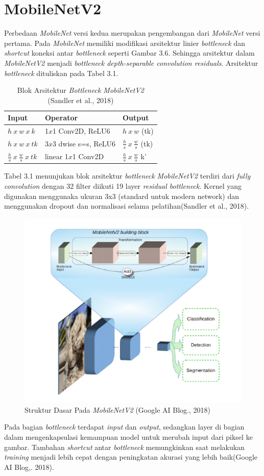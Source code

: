 \section{MobileNetV2}
Perbedaan \emph{MobileNet} versi kedua merupakan pengembangan dari \emph{MobileNet} versi pertama. Pada \emph{MobileNet} memiliki modifikasi arsitektur linier \emph{bottleneck} dan \emph{shortcut} koneksi antar \emph{bottleneck} seperti Gambar 3.6.
Sehingga arsitektur dalam \emph{MobileNetV2} menjadi \emph{bottleneck depth-separable convolution residuals}. Arsitektur \emph{bottleneck} dituliskan pada Tabel 3.1.
\begin{table}[H]
	\caption{Blok Arsitektur \emph{Bottleneck MobileNetV2} (Sandler et al., 2018)}
	\vspace{0cm}
	\centering
	\begin{tabular}{|p{3cm}|p{4cm}|p{3cm}|}
		\hline
		Input & Operator & Output \\
		\hline
		$h \ x \ w \ x \ k$ & 1$x$1 Conv2D, ReLU6 & $h \ x \ w$ (tk) \\ 
		\hline	
		$h \ x \ w \ x \ tk$ & 3$x$3 dwise s=s, ReLU6 & $\frac{h}{s} \ x \ \frac{w}{s}$ (tk) \\ 
		\hline	
		$\frac{h}{s} \ x \ \frac{w}{s} \ x \ tk$ & linear 1$x$1 Conv2D & $\frac{h}{s} \ x \ \frac{w}{s}$ k' \\ 
		\hline				
	\end{tabular}
\end{table}
Tabel 3.1 menunjukan blok arsitektur \emph{bottleneck} \emph{MobileNetV2} terdiri dari \emph{fully convolution} dengan 32 filter diikuti 19 layer \emph{residual bottleneck}.
Kernel yang digunakan menggunaka ukuran 3x3 (standard untuk modern network) dan menggunakan dropout dan normalisasi selama pelatihan(Sandler et al., 2018). 
\begin{figure}[H]
	\centering
	\includegraphics[width=0.6\linewidth]{"arsitektur"}
	\caption{Struktur Dasar Pada \emph{MobileNetV2} (Google AI Blog., 2018)}
	\label{fig:arsitektur}
\end{figure}
\noindent Pada bagian \emph{bottleneck} terdapat \emph{input} dan \emph{output}, sedangkan layer di bagian dalam mengenkapsulasi kemampuan model untuk merubah input dari piksel ke gambar. Tambahan \emph{shortcut} antar \emph{bottleneck} memungkinkan saat melakukan \emph{training} menjadi lebih cepat dengan peningkatan akurasi yang lebih baik(Google AI Blog,. 2018).
